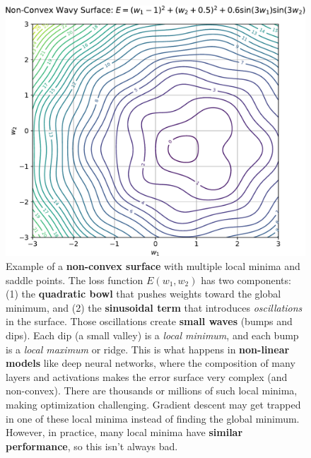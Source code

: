 \begin{figure}[!htp]
    \centering
    \includegraphics[width=\textwidth]{img/learning-and-optimization/non-convex-wavy-contour.pdf}
    \caption{Example of a \textbf{non-convex surface} with multiple local minima and saddle points. The loss function $E\left(w_{1}, w_{2}\right)$ has two components: (1) the \textbf{quadratic bowl} that pushes weights toward the global minimum, and (2) the \textbf{sinusoidal term} that introduces \emph{oscillations} in the surface. Those oscillations create \textbf{small waves} (bumps and dips). Each dip (a small valley) is a \emph{local minimum}, and each bump is a \emph{local maximum} or ridge. This is what happens in \textbf{non-linear models} like deep neural networks, where the composition of many layers and activations makes the error surface very complex (and non-convex). There are thousands or millions of such local minima, making optimization challenging. Gradient descent may get trapped in one of these local minima instead of finding the global minimum. However, in practice, many local minima have \textbf{similar performance}, so this isn't always bad.}
    \label{fig:non-convex-surface-contour}
\end{figure}